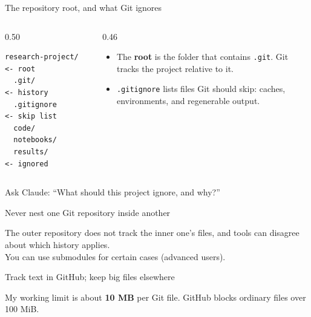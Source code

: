 \begin{frame}[fragile]{The repository root, and what Git ignores}
  \vfill
  \begin{columns}[c]
    \begin{column}{0.50\textwidth}
      \begin{lstlisting}[basicstyle=\ttfamily\footnotesize]
research-project/  <- root
  .git/            <- history
  .gitignore       <- skip list
  code/
  notebooks/
  results/         <- ignored
      \end{lstlisting}
    \end{column}
    \begin{column}{0.46\textwidth}
      \begin{itemize}\setlength\itemsep{0.8em}
        \item The \textbf{root} is the folder that contains \texttt{.git}. Git tracks the project relative to it.
        \item \texttt{.gitignore} lists files Git should skip: caches, environments, and regenerable output.
      \end{itemize}
    \end{column}
  \end{columns}
  \vspace{0.9em}
  \begin{center}\small
    Ask Claude: ``What should this project ignore, and why?''
  \end{center}
  \vspace{1.4cm plus 1fill}
\end{frame}

\begin{frame}{Never nest one Git repository inside another}
  \vfill
  \begin{center}
    \resizebox{0.94\linewidth}{!}{}
  \end{center}
  \vspace{0.9em}
  \begin{center}\small
    The outer repository does not track the inner one's files, and tools can disagree about which history applies.\\[0.5em]
    You can use submodules for certain cases (advanced users).
  \end{center}
  \vspace{1.2cm plus 1fill}
\end{frame}

\begin{frame}{Track text in GitHub; keep big files elsewhere}
  \vfill
  \begin{center}
    \resizebox{0.86\linewidth}{!}{}
  \end{center}
  \vspace{0.6em}
  \begin{center}\small
    My working limit is about \textbf{10 MB} per Git file. GitHub blocks ordinary files over 100 MiB.
  \end{center}
  \vspace{1.6cm plus 1fill}
\end{frame}

